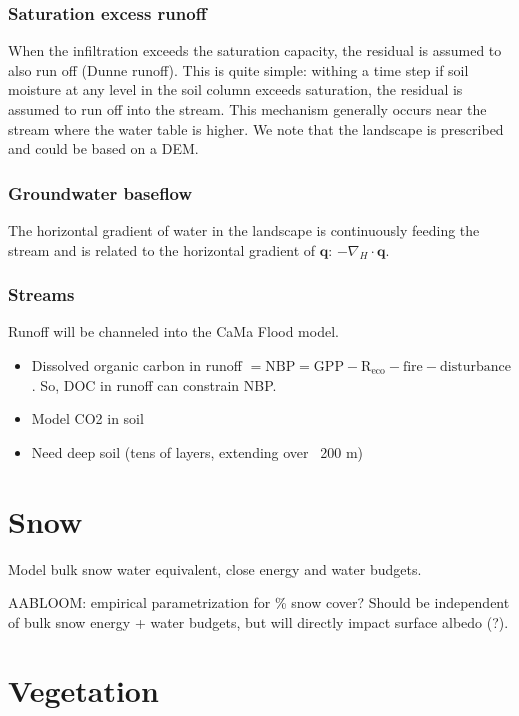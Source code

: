 \documentclass{article}
\begin{document}
\subsubsection{Saturation excess runoff}
When the infiltration exceeds the saturation capacity, the residual is assumed to also run off (Dunne runoff). This is quite simple: withing a time step if soil moisture at any level in the soil column exceeds saturation, the residual is assumed to run off into the stream. This mechanism generally occurs near the stream where the water table is higher. We note that the landscape is prescribed and could be based on a DEM. 

\subsubsection{Groundwater baseflow}
The horizontal gradient of water in the landscape is continuously feeding the stream and is related to the horizontal gradient of $\mathbf{q}$: $-\nabla_H \cdot \mathbf{q}$.

\subsubsection{Streams}
Runoff will be channeled into the CaMa Flood model.

\begin{itemize}
\item Dissolved organic carbon in runoff $\mathrm{= NBP = GPP - R_{eco} - fire - disturbance}$. So, DOC in runoff can constrain NBP.

\item Model CO2 in soil
\item Need deep soil (tens of layers, extending over ~200 m)
\end{itemize}

\section{Snow}

Model bulk snow water equivalent, close energy and water budgets.

AABLOOM: empirical parametrization for \% snow cover? Should be independent of bulk snow energy + water budgets, but will directly impact surface albedo (?).

\section{Vegetation}
\end{document}
